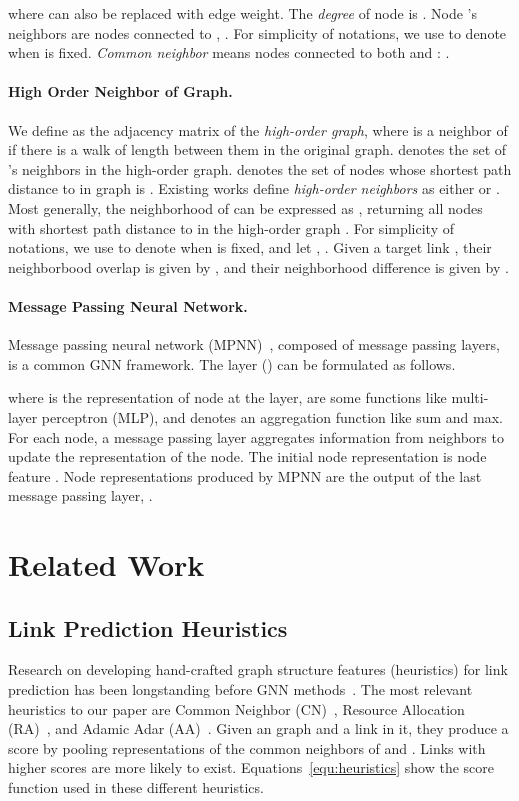 \documentclass{article}
\theoremstyle{plain}
\theoremstyle{definition}
\theoremstyle{remark}
\begin{document}
where  can also be replaced with edge weight. The \textit{degree} of node  is . Node 's neighbors are nodes connected to , . For simplicity of notations, we use  to denote  when  is fixed. \textit{Common neighbor} means nodes connected to both  and : .

\paragraph{High Order Neighbor of Graph.} We define  as the adjacency matrix of the \textit{high-order graph}, where  is a neighbor of  if there is a walk of length  between them in the original graph.  denotes the set of 's neighbors in the high-order graph.  denotes the set of nodes whose shortest path distance to  in graph  is . Existing works define \textit{high-order neighbors} as either  or . Most generally, the neighborhood of  can be expressed as , returning all nodes with shortest path distance  to  in the high-order graph . For simplicity of notations, we use  to denote  when  is fixed, and let , . Given a target link , their neighborbood overlap is given by , and their neighborhood difference is given by .

\paragraph{Message Passing Neural Network.}
Message passing neural network (MPNN)~\citep{MPNN}, composed of message passing layers, is a common GNN framework. The  layer () can be formulated as follows.

where  is the representation of node  at the  layer,   are some functions like multi-layer perceptron (MLP), and  denotes an aggregation function like sum and max. For each node, a message passing layer aggregates information from neighbors to update the representation of the node. The initial node representation  is node feature . Node representations produced by MPNN are the output of the last message passing layer, . 

\section{Related Work}
\subsection{Link Prediction Heuristics}\label{sec:heuristic}
Research on developing hand-crafted graph structure features (heuristics) for link prediction has been longstanding before GNN methods~\citep{liben2003link}. The most relevant heuristics to our paper are Common Neighbor (CN)~\citep{CommonNeighbor}, Resource Allocation (RA)~\citep{RA}, and Adamic Adar (AA)~\citep{AA}. Given an graph and a link  in it, they produce a score  by pooling representations of the common neighbors of  and . Links with higher scores are more likely to exist. Equations~\ref{equ:heuristics} show the score function used in these different heuristics.
\end{document}
